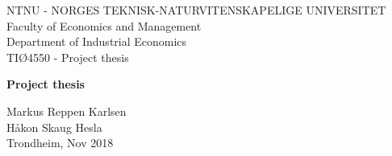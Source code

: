 \begin{titlepage}
\vspace * {-2.5cm}	
	NTNU - NORGES TEKNISK-NATURVITENSKAPELIGE UNIVERSITET\\
	Faculty of Economics and Management\\
	Department of Industrial Economics\\
	TI\O4550 - Project thesis
	
\begin{center}

\vspace * {5cm}
\huge \textbf{Project thesis}

%
%


\vspace * {2cm}

\large
Markus Reppen Karlsen\\H\r{a}kon Skaug Hesla\\Trondheim, Nov 2018
\end{center}

\end{titlepage}
